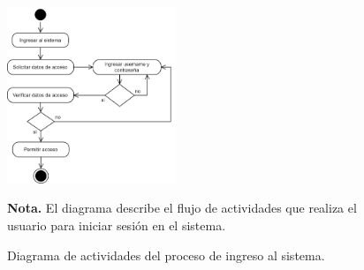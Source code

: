 	\begin{figure}[!h] %
		\caption[Diagrama de actividades - Ingresar al sistema]
		{\newline Diagrama de actividades del proceso de ingreso al sistema.} %
		\centering
		\includegraphics[width=0.45\textwidth]{imagenes/cap_3/ingreso.drawio.png} %
		
		\begin{flushleft}
		\begin{doublespace}
			\hspace{1.20cm} \textbf{Nota.} El diagrama describe el flujo de actividades que realiza el usuario para iniciar sesión en el sistema. %
		\end{doublespace}
		\end{flushleft}
		\vspace{-16pt}
		\label{fig:DA_ingreso} %
	\end{figure}

	\vspace{0.3cm} %
	
